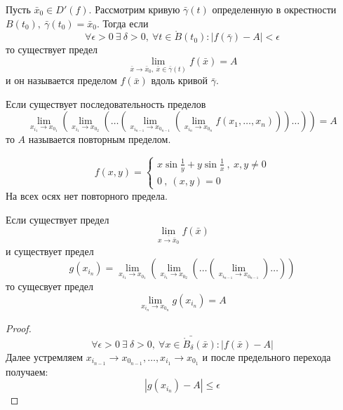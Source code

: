 \begin{definition}
    Пусть $\bar{x}_0\in D'(f)$. Рассмотрим кривую $\bar{\gamma}(t)$ определенную в окрестности $B(t_0),\ \bar{\gamma}(t_0)=\bar{x}_0$. Тогда если 
    \[\forall \epsilon>0\ \exists\ \delta>0,\ \forall t\in \mathring{B}(t_0): |f(\bar{\gamma})-A|<\epsilon\]
    то существует предел 
    \[\lim\limits_{\bar{x}\to \bar{x}_0,\ \bar{x}\in \bar{\gamma}(t)}f(\bar{x})=A\]
    и он называется пределом $f(\bar{x})$ вдоль кривой $\bar{\gamma}$.
\end{definition} 
\begin{definition}
    Если существует последовательность пределов
    \[\lim\limits_{x_{i_1}\to x_{0_1}}(\lim\limits_{x_{i_1}\to x_{0_2}}(\dots(\lim\limits_{x_{i_{n-1}}\to x_{0_{n-1}}}(\lim\limits_{x_{i_n}\to x_{0_n}}f(x_1,\dots,x_n)))\dots))=A\]
    то $A$ называется повторным пределом. 
\end{definition} 
\begin{example}
    \[f(x,y)=\begin{cases}
        x\sin{\frac{1}{y}+y\sin{\frac{1}{x}}}\ ,\ x,y\ne 0\\
        0\ ,\ (x, y)=0
    \end{cases}
    \]
    На всех осях нет повторного предела.
\end{example}
\begin{theorem}
    Если существует предел
    \[\lim\limits_{\bar{x\to \bar{x}_0}}f(\bar{x})\]
    и существует предел
    \[g(x_{i_n})=\lim\limits_{x_{i_1}\to x_{0_1}}(\lim\limits_{x_{i_1}\to x_{0_2}}(\dots(\lim\limits_{x_{i_{n-1}}\to x_{0_{n-1}}})\dots))\]
    то сущесвует предел
    \[\lim\limits_{x_{i_n}\to x_{0_n}}g(x_{i_n})=A\]
\end{theorem} 
\begin{proof}
    \[\forall \epsilon>0\ \exists\ \delta>0,\ \forall \bar{x\in \mathring{B}_{\delta}(\bar{x})}: |f(\bar{x})-A|\]
    Далее устремляем $x_{i_{n-1}}\to x_{0_{n-1}}, \dots, x_{i_1}\to x_{0_1}$ и после предельного перехода получаем:
    \[|g(x_{i_n})-A|\leq \epsilon\]
\end{proof} 
